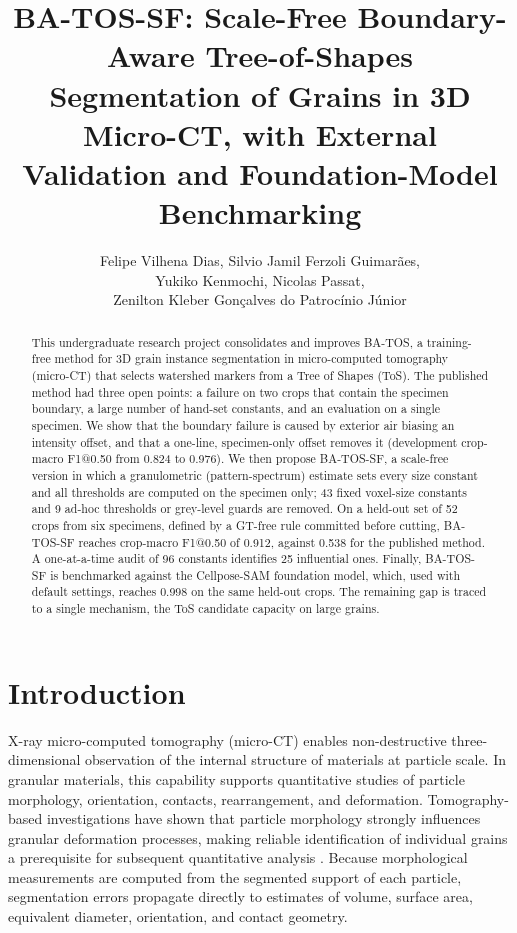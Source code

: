 \documentclass[12pt]{article}
\title{BA-TOS-SF: Scale-Free Boundary-Aware Tree-of-Shapes Segmentation of Grains in 3D Micro-CT, with External Validation and Foundation-Model Benchmarking}
\author{Felipe Vilhena Dias\inst{1}, Silvio Jamil Ferzoli Guimarães\inst{1},\\ Yukiko Kenmochi\inst{2}, Nicolas Passat\inst{3},\\ Zenilton Kleber Gonçalves do Patrocínio Júnior\inst{1}}
\begin{document}
\maketitle

\begin{abstract}
This undergraduate research project consolidates and improves BA-TOS, a training-free method for 3D grain
instance segmentation in micro-computed tomography (micro-CT) that selects watershed markers from a Tree of
Shapes (ToS). The published method had three open points: a failure on two crops that contain the specimen
boundary, a large number of hand-set constants, and an evaluation on a single specimen. We show that the
boundary failure is caused by exterior air biasing an intensity offset, and that a one-line, specimen-only
offset removes it (development crop-macro F1@0.50 from 0.824 to 0.976). We then propose BA-TOS-SF, a scale-free
version in which a granulometric (pattern-spectrum) estimate sets every size constant and all thresholds are
computed on the specimen only; 43 fixed voxel-size constants and 9 ad-hoc thresholds or grey-level guards are
removed. On a held-out set of 52 crops from six specimens, defined by a GT-free rule committed before cutting,
BA-TOS-SF reaches crop-macro F1@0.50 of 0.912, against 0.538 for the published method. A one-at-a-time audit of 96
constants identifies 25 influential ones. Finally, BA-TOS-SF is benchmarked against the Cellpose-SAM foundation
model, which, used with default settings, reaches 0.998 on the same held-out crops. The remaining gap is traced to
a single mechanism, the ToS candidate capacity on large grains.
\end{abstract}

\section{Introduction}

X-ray micro-computed tomography (micro-CT) enables non-destructive three-dimensional observation of the internal
structure of materials at particle scale. In granular materials, this capability supports quantitative studies of
particle morphology, orientation, contacts, rearrangement, and deformation. Tomography-based investigations have
shown that particle morphology strongly influences granular deformation processes, making reliable identification
of individual grains a prerequisite for subsequent quantitative analysis \citep{pinzon2025}. Because morphological
measurements are computed from the segmented support of each particle, segmentation errors propagate directly to
estimates of volume, surface area, equivalent diameter, orientation, and contact geometry.
\end{document}
